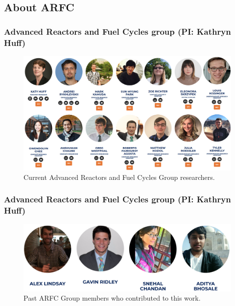 \subsection{About ARFC}
\begin{frame}
  \frametitle{Advanced Reactors and Fuel Cycles group (PI: Kathryn Huff)}
               \begin{figure}[t]
                \vspace*{-0.25in}
                \hspace*{-0.35in}
                \includegraphics[height=0.63\textwidth]{./images/arfc1.png}
                \caption{Current Advanced Reactors and Fuel Cycles Group researchers.}
               \end{figure}            
\end{frame}

\begin{frame}
  \frametitle{Advanced Reactors and Fuel Cycles group (PI: Kathryn Huff)}
               \begin{figure}[t]
                \includegraphics[height=0.33\textwidth]{./images/arfc_past.png}
                \caption{Past ARFC Group members who contributed to this work.}
               \end{figure}            
\end{frame}


